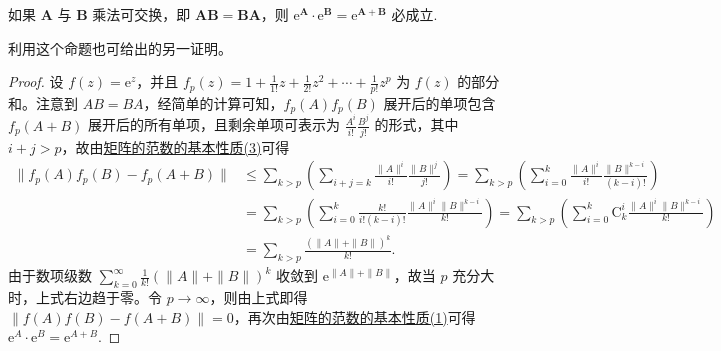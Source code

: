 \documentclass[../../main.tex]{subfiles}
\begin{document}
\begin{proposition}\label{proposition:矩阵乘法可交换必成立e^A乘e^B=e^A+B}
如果 $\boldsymbol{A}$ 与 $\boldsymbol{B}$ 乘法可交换，即 $\boldsymbol{A}\boldsymbol{B}=\boldsymbol{B}\boldsymbol{A}$，则 $\mathrm{e}^{\boldsymbol{A}}\cdot\mathrm{e}^{\boldsymbol{B}}=\mathrm{e}^{\boldsymbol{A}+\boldsymbol{B}}$ 必成立.
\end{proposition}
\begin{remark}
利用这个命题也可给出的另一证明。 
\end{remark}
\begin{proof}
设 $f(z)=\mathrm{e}^z$，并且 $f_p(z)=1+\frac{1}{1!}z+\frac{1}{2!}z^2+\cdots+\frac{1}{p!}z^p$ 为 $f(z)$ 的部分和。注意到 $AB = BA$，经简单的计算可知，$f_p(A)f_p(B)$ 展开后的单项包含 $f_p(A + B)$ 展开后的所有单项，且剩余单项可表示为 $\frac{A^i}{i!}\frac{B^j}{j!}$ 的形式，其中 $i + j>p$，故由\hyperref[proposition:矩阵的范数的基本性质]{矩阵的范数的基本性质(3)}可得
\begin{align*}
\parallel f_p(A)f_p(B)-f_p(A+B)\parallel &\le \sum_{k>p}{\left( \sum_{i+j=k}{\frac{\parallel A\parallel ^i}{i!}\frac{\parallel B\parallel ^j}{j!}} \right)}=\sum_{k>p}{\left( \sum_{i=0}^k{\frac{\parallel A\parallel ^i}{i!}\frac{\parallel B\parallel ^{k-i}}{\left( k-i \right) !}} \right)}
\\
&=\sum_{k>p}{\left( \sum_{i=0}^k{\frac{k!}{i!\left( k-i \right) !}\frac{\parallel A\parallel ^i\parallel B\parallel ^{k-i}}{k!}} \right)}=\sum_{k>p}{\left( \sum_{i=0}^k{\mathrm{C}_{k}^{i}\frac{\parallel A\parallel ^i\parallel B\parallel ^{k-i}}{k!}} \right)}
\\
&=\sum_{k>p}{\frac{(\parallel A\parallel +\parallel B\parallel )^k}{k!}}.
\end{align*}
由于数项级数 $\sum_{k = 0}^{\infty}\frac{1}{k!}(\|A\|+\|B\|)^k$ 收敛到 $\mathrm{e}^{\|A\|+\|B\|}$，故当 $p$ 充分大时，上式右边趋于零。令 $p\to\infty$，则由上式即得 $\|f(A)f(B)-f(A + B)\| = 0$，再次由\hyperref[proposition:矩阵的范数的基本性质]{矩阵的范数的基本性质(1)}可得 $\mathrm{e}^A\cdot\mathrm{e}^B = \mathrm{e}^{A + B}$.
\end{proof}
\end{document}
